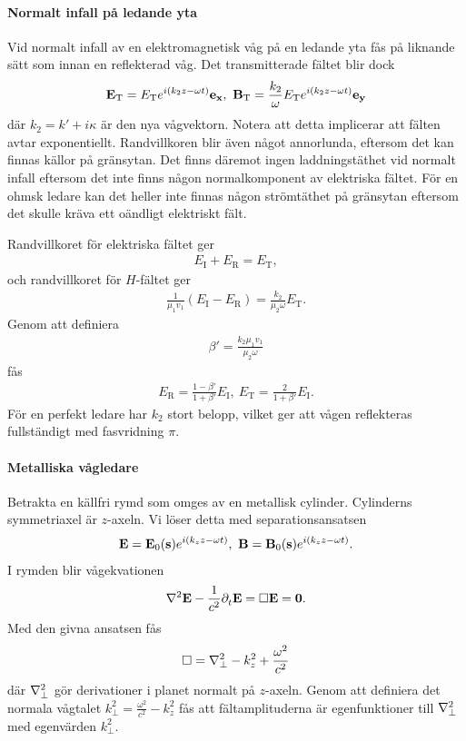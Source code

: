 \paragraph{Normalt infall på ledande yta}
Vid normalt infall av en elektromagnetisk våg på en ledande yta fås på liknande sätt som innan en reflekterad våg. Det transmitterade fältet blir dock
\begin{align*}
	\vb{E}_{\text{T}} = E_{\text{T}}e^{i(k_{2}z - \omega t)}\ub{x},\ \vb{B}_{\text{T}} = \frac{k_{2}}{\omega}E_{\text{T}}e^{i(k_{2}z - \omega t)}\ub{y}
\end{align*}
där $k_{2} = k' + i\kappa$ är den nya vågvektorn. Notera att detta implicerar att fälten avtar exponentiellt. Randvillkoren blir även något annorlunda, eftersom det kan finnas källor på gränsytan. Det finns däremot ingen laddningstäthet vid normalt infall eftersom det inte finns någon normalkomponent av elektriska fältet. För en ohmsk ledare kan det heller inte finnas någon strömtäthet på gränsytan eftersom det skulle kräva ett oändligt elektriskt fält.

Randvillkoret för elektriska fältet ger
\begin{align*}
	E_{\text{I}} + E_{\text{R}} = E_{\text{T}},
\end{align*}
och randvillkoret för $H$-fältet ger
\begin{align*}
	\frac{1}{\mu_{1}v_{1}}(E_{\text{I}} - E_{\text{R}}) = \frac{k_{2}}{\mu_{2}\omega}E_{\text{T}}.
\end{align*}
Genom att definiera
\begin{align*}
	\beta' = \frac{k_{2}\mu_{1}v_{1}}{\mu_{2}\omega}
\end{align*}
fås
\begin{align*}
	E_{\text{R}} = \frac{1 - \beta'}{1 + \beta'}E_{\text{I}},\ E_{\text{T}} = \frac{2}{1 + \beta'}E_{\text{I}}.
\end{align*}
För en perfekt ledare har $k_{2}$ stort belopp, vilket ger att vågen reflekteras fullständigt med fasvridning $\pi$.

\paragraph{Metalliska vågledare}
Betrakta en källfri rymd som omges av en metallisk cylinder. Cylinderns symmetriaxel är $z$-axeln. Vi löser detta med separationsansatsen
\begin{align*}
	\vb{E} = \vb{E}_{0}(\vb{s})e^{i(k_{z}z - \omega t)},\ \vb{B} = \vb{B}_{0}(\vb{s})e^{i(k_{z}z - \omega t)}.
\end{align*}
I rymden blir vågekvationen
\begin{align*}
	\laplacian{\vb{E}} - \frac{1}{c^{2}}\del{t}{\vb{E}} = \dalemb{\vb{E}} = \vb{0}.
\end{align*}
Med den givna ansatsen fås
\begin{align*}
	\dalemb = \laplaperp - k_{z}^{2} + \frac{\omega^{2}}{c^{2}}
\end{align*}
där $\laplaperp$ gör derivationer i planet normalt på $z$-axeln. Genom att definiera det normala vågtalet $k_{\perp}^{2} = \frac{\omega^{2}}{c^{2}} - k_{z}^{2}$ fås att fältamplituderna är egenfunktioner till $\laplaperp$ med egenvärden $k_{\perp}^{2}$.

